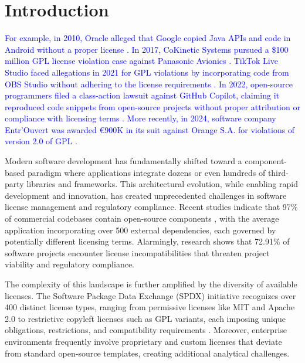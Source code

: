 \section{Introduction}
\label{sec:introduction}



\textcolor{blue}{For example, in 2010, Oracle alleged that Google copied Java APIs and code in Android without a proper license \cite{google_oracle_2021}. In 2017, CoKinetic Systems pursued a \$100 million GPL license violation case against Panasonic Avionics \cite{cokinetic_panasonic_2017}. TikTok Live Studio faced allegations in 2021 for GPL violations by incorporating code from OBS Studio without adhering to the license requirements \cite{fossa2021tiktok}. In 2022, open-source programmers filed a class-action lawsuit against GitHub Copilot, claiming it reproduced code snippets from open-source projects without proper attribution or compliance with licensing terms \cite{butterick2022githubcopilot,butterick2022copilotlawsuit}. More recently, in 2024, software company Entr’Ouvert was awarded €900K in its suit against Orange S.A. for violations of version 2.0 of GPL \cite{stevenson2024wake}.}






Modern software development has fundamentally shifted toward a component-based paradigm where applications integrate dozens or even hundreds of third-party libraries and frameworks. This architectural evolution, while enabling rapid development and innovation, has created unprecedented challenges in software license management and regulatory compliance. Recent studies indicate that 97\% of commercial codebases contain open-source components \cite{synopsys2023ossra}, with the average application incorporating over 500 external dependencies, each governed by potentially different licensing terms. Alarmingly, research shows that 72.91\% of software projects encounter license incompatibilities that threaten project viability and regulatory compliance.

The complexity of this landscape is further amplified by the diversity of available licenses. The Software Package Data Exchange (SPDX) initiative recognizes over 400 distinct license types, ranging from permissive licenses like MIT and Apache 2.0 to restrictive copyleft licenses such as GPL variants, each imposing unique obligations, restrictions, and compatibility requirements \cite{spdx2023specification}. Moreover, enterprise environments frequently involve proprietary and custom licenses that deviate from standard open-source templates, creating additional analytical challenges.

